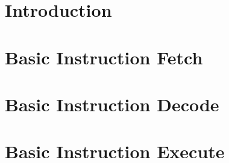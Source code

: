 \documentclass[a4paper]{book}
\begin{document}
\frontmatter
\maketitle
\tableofcontents
\let\cleardoublepage\clearpage
\mainmatter
\chapter{Introduction}


\chapter{Basic Instruction Fetch}


\chapter{Basic Instruction Decode}


\chapter{Basic Instruction Execute}


 

\end{document}
